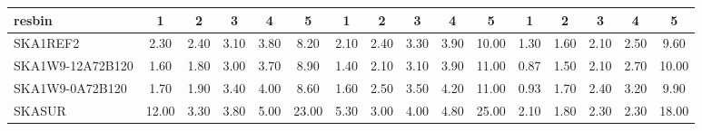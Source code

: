 \begin{table}[!htp]
{{\begin{tabular}{|lccccc||ccccc||ccccc|}
 resbin  &1 & 2 & 3 & 4 & 5 & 1 & 2 & 3 & 4 & 5 & 1 & 2 & 3 & 4 & 5 \tabularnewline \hline
SKA1REF2 & 2.30 \cellcolor{blue!20.83} & 2.40 \cellcolor{red!34.80} & 3.10 \cellcolor{green!23.25} & 3.80 \cellcolor{orange!21.23} & 8.20 \cellcolor{purple!18.00} & 2.10 \cellcolor{blue!25.54} & 2.40 \cellcolor{red!32.00} & 3.30 \cellcolor{green!27.33} & 3.90 \cellcolor{orange!18.00} & 10.00 \cellcolor{purple!18.00} & 1.30 \cellcolor{blue!32.68} & 1.60 \cellcolor{red!32.00} & 2.10 \cellcolor{green!18.00} & 2.50 \cellcolor{orange!27.33} & 9.60 \cellcolor{purple!18.00}\\ \hline 
SKA1W9-12A72B120 & 1.60 \cellcolor{blue!18.00} & 1.80 \cellcolor{red!18.00} & 3.00 \cellcolor{green!18.00} & 3.70 \cellcolor{orange!18.00} & 8.90 \cellcolor{purple!19.99} & 1.40 \cellcolor{blue!18.00} & 2.10 \cellcolor{red!18.00} & 3.10 \cellcolor{green!18.00} & 3.90 \cellcolor{orange!18.00} & 11.00 \cellcolor{purple!20.80} & 0.87 \cellcolor{blue!18.00} & 1.50 \cellcolor{red!18.00} & 2.10 \cellcolor{green!18.00} & 2.70 \cellcolor{orange!36.67} & 10.00 \cellcolor{purple!20.00}\\ \hline 
SKA1W9-0A72B120 & 1.70 \cellcolor{blue!18.40} & 1.90 \cellcolor{red!20.80} & 3.40 \cellcolor{green!39.00} & 4.00 \cellcolor{orange!27.69} & 8.60 \cellcolor{purple!19.14} & 1.60 \cellcolor{blue!20.15} & 2.50 \cellcolor{red!36.67} & 3.50 \cellcolor{green!36.67} & 4.20 \cellcolor{orange!32.00} & 11.00 \cellcolor{purple!20.80} & 0.93 \cellcolor{blue!20.05} & 1.70 \cellcolor{red!46.00} & 2.40 \cellcolor{green!60.00} & 3.20 \cellcolor{orange!60.00} & 9.90 \cellcolor{purple!19.50}\\ \hline 
SKASUR & 12.00 \cellcolor{blue!60.00} & 3.30 \cellcolor{red!60.00} & 3.80 \cellcolor{green!60.00} & 5.00 \cellcolor{orange!60.00} & 23.00 \cellcolor{purple!60.00} & 5.30 \cellcolor{blue!60.00} & 3.00 \cellcolor{red!60.00} & 4.00 \cellcolor{green!60.00} & 4.80 \cellcolor{orange!60.00} & 25.00 \cellcolor{purple!60.00} & 2.10 \cellcolor{blue!60.00} & 1.80 \cellcolor{red!60.00} & 2.30 \cellcolor{green!46.00} & 2.30 \cellcolor{orange!18.00} & 18.00 \cellcolor{purple!60.00}\tabularnewline \hline 
\end{tabular}}\hfil 
{}}
\end{table}

